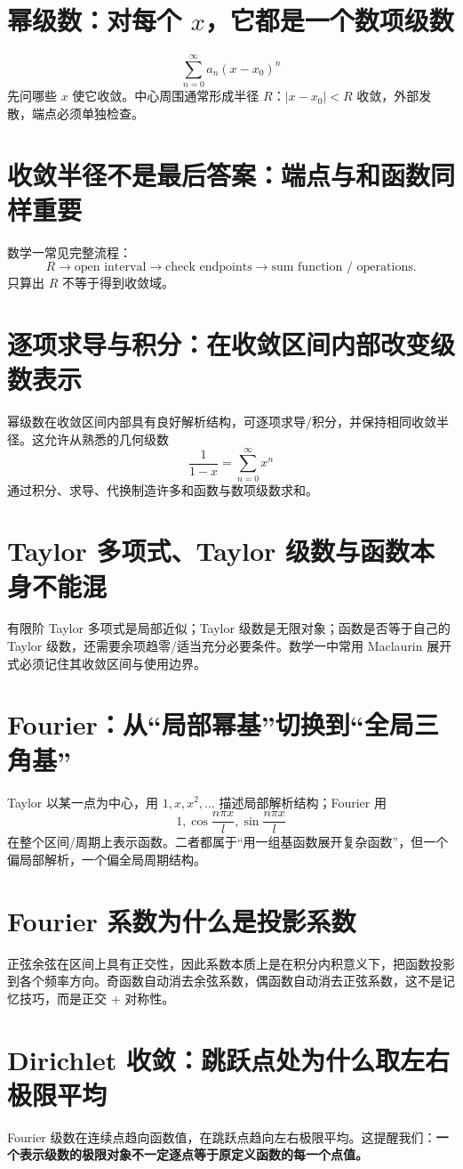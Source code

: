 \documentclass[11pt,a4paper,openany]{ctexbook}
\newcommand{\key}[1]{\textbf{\color{deep}#1}}
\begin{document}
\section{幂级数：对每个 $x$，它都是一个数项级数}
\[
\sum_{n=0}^{\infty}a_n(x-x_0)^n
\]
先问哪些 $x$ 使它收敛。中心周围通常形成半径 $R$：$|x-x_0|<R$ 收敛，外部发散，端点必须单独检查。

\section{收敛半径不是最后答案：端点与和函数同样重要}
数学一常见完整流程：
\[
\boxed{R\to\text{open interval}\to\text{check endpoints}\to\text{sum function / operations}}.
\]
只算出 $R$ 不等于得到收敛域。

\section{逐项求导与积分：在收敛区间内部改变级数表示}
幂级数在收敛区间内部具有良好解析结构，可逐项求导/积分，并保持相同收敛半径。这允许从熟悉的几何级数
\[
\frac1{1-x}=\sum_{n=0}^{\infty}x^n
\]
通过积分、求导、代换制造许多和函数与数项级数求和。

\section{Taylor 多项式、Taylor 级数与函数本身不能混}
有限阶 Taylor 多项式是局部近似；Taylor 级数是无限对象；函数是否等于自己的 Taylor 级数，还需要余项趋零/适当充分必要条件。数学一中常用 Maclaurin 展开式必须记住其收敛区间与使用边界。

\section{Fourier：从“局部幂基”切换到“全局三角基”}
Taylor 以某一点为中心，用 $1,x,x^2,\dots$ 描述局部解析结构；Fourier 用
\[
1,\cos\frac{n\pi x}{l},\sin\frac{n\pi x}{l}
\]
在整个区间/周期上表示函数。二者都属于“用一组基函数展开复杂函数”，但一个偏局部解析，一个偏全局周期结构。

\section{Fourier 系数为什么是投影系数}
正弦余弦在区间上具有正交性，因此系数本质上是在积分内积意义下，把函数投影到各个频率方向。奇函数自动消去余弦系数，偶函数自动消去正弦系数，这不是记忆技巧，而是正交 + 对称性。

\section{Dirichlet 收敛：跳跃点处为什么取左右极限平均}
Fourier 级数在连续点趋向函数值，在跳跃点趋向左右极限平均。这提醒我们：\key{一个表示级数的极限对象不一定逐点等于原定义函数的每一个点值。}
\end{document}
